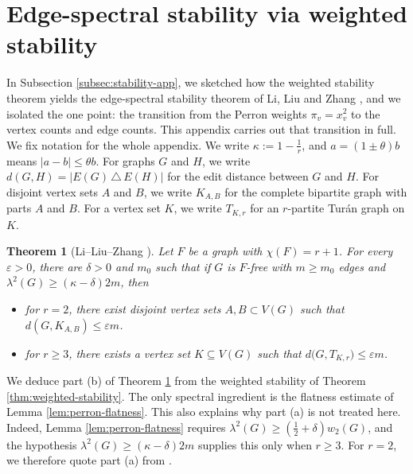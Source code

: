 \documentclass[11pt, a4paper]{article}
\newtheorem{theorem}{Theorem}[section]
\theoremstyle{definition}
\theoremstyle{plain}
\renewcommand{\le}{\leqslant}
\renewcommand{\ge}{\geqslant}
\begin{document}
\appendix 
\section{Edge-spectral stability via weighted stability}
\label{sec:appendix-stability}


In Subsection \ref{subsec:stability-app}, we sketched how the weighted stability theorem yields the edge-spectral stability theorem of Li, Liu and Zhang \cite[Theorem 1.6]{LLZ-ESS}, and
we isolated the one point: the transition from the Perron weights $\pi_v=x_v^2$ to the vertex
counts and edge counts. This
appendix carries out that transition in full. 
We fix notation for the whole appendix. We
write $\kappa :=1-\frac1r$, and $a=(1\pm \theta )b$ means $|a-b|\le \theta b$. For graphs $G$ and $H$, we write
$d(G,H)=|E(G)\, \triangle \, E(H)|$ for the edit distance
between $G$ and $H$. For disjoint vertex sets $A$ and $B$, we write $K_{A,B}$ for the complete bipartite graph with parts $A$ and $B$. For a vertex set $K$, we write $T_{K,r}$ for an $r$-partite Tur\'{a}n  graph on $K$. 


\begin{theorem}[Li--Liu--Zhang \cite{LLZ-ESS}]
\label{thm:edge-spectral-stability}
Let $F$ be a graph with $\chi (F)=r+1$. 
For every $\varepsilon > 0 $, there are  
$\delta >0$ and $m_0$ such that  
if $G$ is $F$-free with $m\ge m_0$ edges and
$  \lambda^2(G) \ge  (\kappa -\delta )2m$, 
then
\begin{itemize}
\item[\rm (a)] 
 for $r=2$, there exist disjoint vertex sets $A,B\subset V(G)$ such that $d(G,K_{A,B}) \le \varepsilon m$.
 
\item[\rm (b)]  for $r\ge 3$, there exists a vertex set $K\subseteq V(G)$ such that 
$d\bigl(G,T_{K,r}\bigr)\le \varepsilon m$. 
\end{itemize}
\end{theorem}


We deduce part (b) of Theorem
\ref{thm:edge-spectral-stability} from the weighted stability of Theorem \ref{thm:weighted-stability}. The only spectral ingredient is the flatness estimate of 
Lemma \ref{lem:perron-flatness}. 
This also explains why part (a) is not treated here. 
Indeed, Lemma
\ref{lem:perron-flatness} requires $\lambda^2(G)\ge \left( \frac12+\delta \right) w_2(G)$, and the hypothesis
$\lambda^{2}(G)\ge (\kappa -\delta )2m$ supplies this only
when $r\ge 3$. For $r=2$, we therefore quote part (a) from \cite{LLZ-ESS}.
\end{document}
